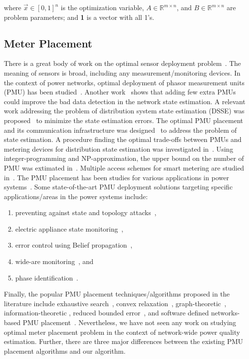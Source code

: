 where $\vec{x}\in [0, 1]^n$ is the optimization variable, $A \in \mathbb{R}^{m \times n}$, and $B \in \mathbb{R}^{m \times n}$ are problem parameters;  and \textbf{1} is a vector with all 1's.

\subsection{Meter Placement}
\label{subsec:relatedwork_meterplacement}
There is a great body of work on the optimal sensor deployment problem~\cite{Krause09}. The meaning of sensors is broad, including any measurement/monitoring devices. In the context of power networks, optimal deployment of phasor measurement units (PMU) has been studied~\cite{Yuill11}. Another work~\cite{chen2006placement} shows that adding few extra PMUs could improve the bad data detection in the network state estimation. A relevant work addressing the problem of distribution system state estimation (DSSE) was proposed~\cite{singh2011meter} to minimize the state estimation errors. The optimal PMU placement and its communication infrastructure was designed~\cite{shahraeini2012co} to address the problem of state estimation. A procedure finding the optimal trade-offs between PMUs and metering devices for distribution state estimation was investigated in~\cite{liu2012trade}. Using integer-programming and NP-approximation, the upper bound on the number of PMU was extimated in~\cite{uddin2012approximate, uddin2014nested}. Multiple access schemes for smart metering are studied in~\cite{li2011efficient}. The PMU placement has been studies for various applications in power systems~\cite{de2010synchronized}. Some state-of-the-art PMU deployment solutions targeting specific applications/areas in the power systems include:

\begin{enumerate}
\item preventing against state and topology attacks~\cite{kim2013phasor},
\item electric appliance state monitoring~\cite{hao2012smart},
\item error control using Belief propagation~\cite{deka2011pmu},
\item wide-are monitoring~\cite{wen2013optimal}, and
\item phase identification~\cite{short2013advanced}.
\end{enumerate}

\vspace{0.5cm}
\noindent Finally, the popular PMU placement techniques/algorithms proposed in the literature include exhaustive search~\cite{azizi2012optimal}, convex relaxation~\cite{kekatos2012optimal}, graph-theoretic~\cite{anderson2012graph}, information-theoretic \cite{li2013information}, reduced bounded error~\cite{lunden2014real}, and software defined networks-based PMU placement~\cite{goodney2013efficient}. Nevertheless, we have not seen any work on studying optimal meter placement problem in the context of network-wide power quality estimation. Further, there are three major differences between the existing PMU placement algorithms and our algorithm.

